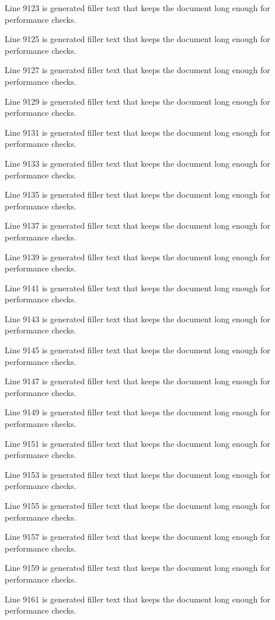 Line 9123 is generated filler text that keeps the document long enough for performance checks.

Line 9125 is generated filler text that keeps the document long enough for performance checks.

Line 9127 is generated filler text that keeps the document long enough for performance checks.

Line 9129 is generated filler text that keeps the document long enough for performance checks.

Line 9131 is generated filler text that keeps the document long enough for performance checks.

Line 9133 is generated filler text that keeps the document long enough for performance checks.

Line 9135 is generated filler text that keeps the document long enough for performance checks.

Line 9137 is generated filler text that keeps the document long enough for performance checks.

Line 9139 is generated filler text that keeps the document long enough for performance checks.

Line 9141 is generated filler text that keeps the document long enough for performance checks.

Line 9143 is generated filler text that keeps the document long enough for performance checks.

Line 9145 is generated filler text that keeps the document long enough for performance checks.

Line 9147 is generated filler text that keeps the document long enough for performance checks.

Line 9149 is generated filler text that keeps the document long enough for performance checks.

Line 9151 is generated filler text that keeps the document long enough for performance checks.

Line 9153 is generated filler text that keeps the document long enough for performance checks.

Line 9155 is generated filler text that keeps the document long enough for performance checks.

Line 9157 is generated filler text that keeps the document long enough for performance checks.

Line 9159 is generated filler text that keeps the document long enough for performance checks.

Line 9161 is generated filler text that keeps the document long enough for performance checks.

